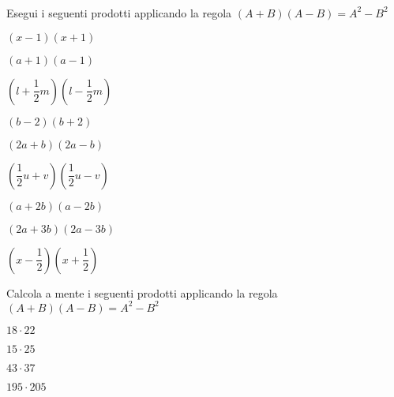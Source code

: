 \subsubsection*{}

\begin{esercizio}
 \label{ese:11.17}
Esegui i seguenti prodotti applicando la regola
$\left(A+B\right)\left(A-B\right)=A^{2}-B^{2}$
 \begin{multicols}{3}
\begin{enumeratea}
 \item $\left(x-1\right)\left(x+1\right)$
 \item $\left(a+1\right)\left(a-1\right)$
 \item $\left(l+\dfrac{1}{2}m\right)\left(l-\dfrac{1}{2}m\right)$
 \item $\left(b-2\right)\left(b+2\right)$
 \item $\left(2a+b\right)\left(2a-b\right)$
 \item $\left(\dfrac{1}{2}u+v\right)\left(\dfrac{1}{2}u-v\right)$
 \item $\left(a+2b\right)\left(a-2b\right)$
 \item $\left(2a+3b\right)\left(2a-3b\right)$
 \item $\left(x-\dfrac{1}{2}\right)\left(x+\dfrac{1}{2}\right)$
\end{enumeratea}
\end{multicols}
\end{esercizio}

\newpage %

\begin{esercizio}
 \label{ese:11.16}
 Calcola a mente i seguenti prodotti applicando la regola $(A+B)(A-B)=A^2-B^2$
 \begin{multicols}{4}
\begin{enumeratea}
 \item $18\cdot 22$
 \item $15\cdot 25$
 \item $43\cdot 37$
 \item $195\cdot 205$
\end{enumeratea}
\end{multicols}
\end{esercizio}

